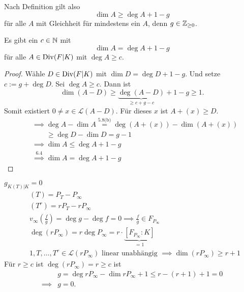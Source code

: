 \begin{bemerkungnr}
    Nach Definition gilt also 
    $$ \dim A \geq \deg A + 1 -g $$
    für alle $A$ mit Gleichheit für mindestens ein $A$, denn $g \in \mathbb{Z}_{\geq 0}$.
\end{bemerkungnr}

\begin{theorem}[Riemann]
    Es gibt ein $c \in \mathbb{N}$ mit $$ \dim A = \deg A +1 -g$$
    für alle $A \in \operatorname{Div}(F|K)$ mit $\deg A \geq c$.
\end{theorem}
\begin{proof}
    Wähle $D \in \operatorname{Div}(F|K)$ mit $\dim D = \deg D + 1 - g$.
    Und setze $c := g + \deg D$. Sei $\deg A \geq c$.
    Dann ist 
    $$\dim (A-D) \geq \underbrace{\deg(A-D)}_{\geq c + g - c} + 1 -g \geq 1.$$
    Somit existiert $0 \ne x \in \mathcal{L}(A-D)$. 
    Für dieses $x$ ist $A + (x) \geq D$.
    \begin{align*}
        &\implies \deg A - \dim A \overset{\text{5.8(b)}}{=} \deg (A + (x)) - \dim (A + (x))\\
        & \qquad \geq \deg D - \dim D = g - 1\\
        &\implies \dim A \leq \deg A + 1 - g\\
        &\overset{6.4}{\implies} \dim A = \deg A + 1 - g
    \end{align*} 
\end{proof}

\begin{beispiel}
    $g_{K(T)|K} = 0$
    \begin{align*}
        &(T) = P_T - P_\infty\\
        &(T^r) = r P_T - r P_\infty\\
        &v_\infty\left(\frac{f}{g}\right) = \deg g - \deg f = 0 \implies \frac{f}{g} \in F_{P_\infty}\\
        &\deg(rP_\infty) = r \deg P_\infty = r \cdot \underbrace{[F_{P_\infty}:K]}_{=1}\\
        &1,T,\ldots,T^r \in \mathcal{L}(rP_\infty) \text{ linear unabhängig }\implies \dim(rP_\infty) \geq r +1
    \end{align*}
    Für $r \geq c$ ist $\deg(rP_\infty) = r \geq c$ ist
    \begin{align*}
        & g = \deg rP_\infty - \dim rP_\infty + 1 \leq r - (r+1) + 1 = 0\\
        \implies & g=0.
    \end{align*}
\end{beispiel}

